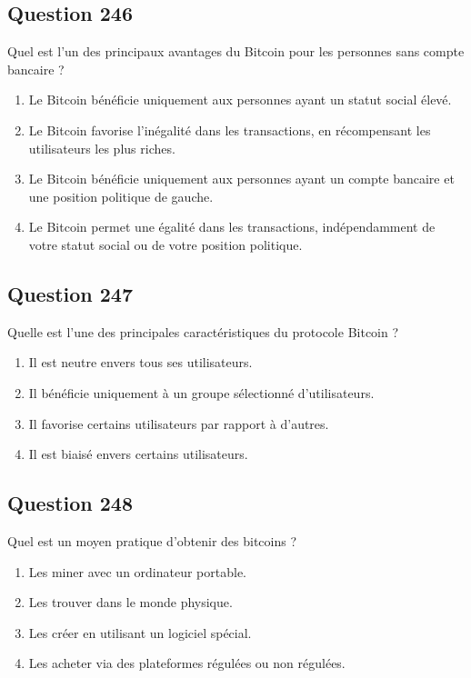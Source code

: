 \documentclass[12pt,a4paper]{article}
\begin{document}
\bigskip


\subsection*{Question 246}
Quel est l'un des principaux avantages du Bitcoin pour les personnes sans compte bancaire ?

\begin{enumerate}[label=\Alph*., leftmargin=*]
\item Le Bitcoin bénéficie uniquement aux personnes ayant un statut social élevé.
\item Le Bitcoin favorise l'inégalité dans les transactions, en récompensant les utilisateurs les plus riches.
\item Le Bitcoin bénéficie uniquement aux personnes ayant un compte bancaire et une position politique de gauche.
\item Le Bitcoin permet une égalité dans les transactions, indépendamment de votre statut social ou de votre position politique.
\end{enumerate}

\bigskip


\subsection*{Question 247}
Quelle est l'une des principales caractéristiques du protocole Bitcoin ?

\begin{enumerate}[label=\Alph*., leftmargin=*]
\item Il est neutre envers tous ses utilisateurs.
\item Il bénéficie uniquement à un groupe sélectionné d'utilisateurs.
\item Il favorise certains utilisateurs par rapport à d'autres.
\item Il est biaisé envers certains utilisateurs.
\end{enumerate}

\bigskip


\subsection*{Question 248}
Quel est un moyen pratique d'obtenir des bitcoins ?

\begin{enumerate}[label=\Alph*., leftmargin=*]
\item Les miner avec un ordinateur portable.
\item Les trouver dans le monde physique.
\item Les créer en utilisant un logiciel spécial.
\item Les acheter via des plateformes régulées ou non régulées.
\end{enumerate}
\end{document}
